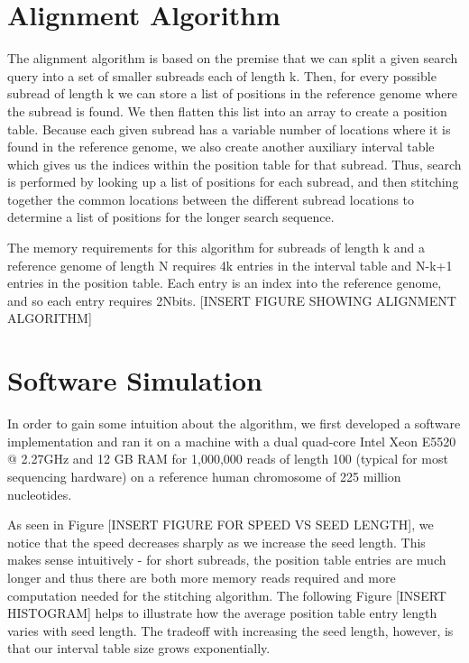 \documentclass[11pt]{article}
\begin{document}
\section{Alignment Algorithm}

The alignment algorithm is based on the premise that we can split a given search query into a set of smaller subreads each of length k. Then, for every possible subread of length k we can store a list of positions in the reference genome where the subread is found. We then flatten this list into an array to create a position table. Because each given subread has a variable number of locations where it is found in the reference genome, we also create another auxiliary interval table which gives us the indices within the position table for that subread. Thus, search is performed by looking up a list of positions for each subread, and then stitching together the common locations between the different subread locations to determine a list of positions for the longer search sequence.


The memory requirements for this algorithm for subreads of length k and a reference genome of length N requires 4k entries in the interval table and N-k+1 entries in the position table. Each entry is an index into the reference genome, and so each entry requires 2Nbits.
[INSERT FIGURE SHOWING ALIGNMENT ALGORITHM]


\section{Software Simulation}

In order to gain some intuition about the algorithm, we first developed a software implementation and ran it on a machine with a dual quad-core Intel Xeon E5520 @ 2.27GHz and 12 GB RAM for 1,000,000 reads of length 100 (typical for most sequencing hardware) on a reference human chromosome of 225 million nucleotides.


As seen in Figure [INSERT FIGURE FOR SPEED VS SEED LENGTH], we notice that the speed decreases sharply as we increase the seed length. This makes sense intuitively - for short subreads, the position table entries are much longer and thus there are both more memory reads required and more computation needed for the stitching algorithm. The following Figure [INSERT HISTOGRAM] helps to illustrate how the average position table entry length varies with seed length. The tradeoff with increasing the seed length, however, is that our interval table size grows exponentially.
\end{document}
